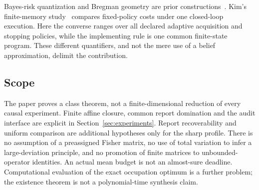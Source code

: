 Bayes-risk quantization and Bregman geometry are prior constructions~\cite{Varshney}. Kim's finite-memory study~\cite{Kim} compares fixed-policy costs under one closed-loop execution. Here the converse ranges over all declared adaptive acquisition and stopping policies, while the implementing rule is one common finite-state program. These different quantifiers, and not the mere use of a belief approximation, delimit the contribution.

\subsection*{Scope}
The paper proves a class theorem, not a finite-dimensional reduction of every causal experiment. Finite affine closure, common report domination and the audit interface are explicit in Section~\ref{sec:experiments}. Report recoverability and uniform comparison are additional hypotheses only for the sharp profile. There is no assumption of a preassigned Fisher matrix, no use of total variation to infer a large-deviation principle, and no promotion of finite matrices to unbounded-operator identities. An actual mean budget is not an almost-sure deadline. Computational evaluation of the exact occupation optimum is a further problem; the existence theorem is not a polynomial-time synthesis claim.
